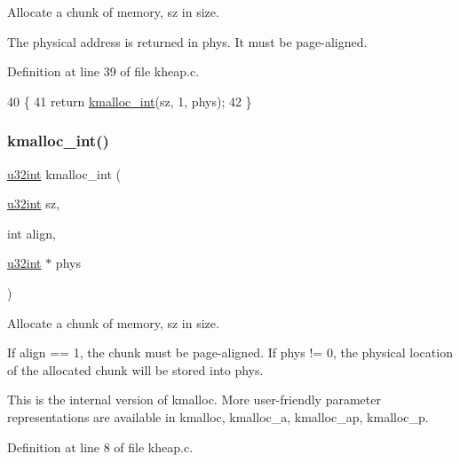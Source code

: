 Allocate a chunk of memory, sz in size. 

The physical address is returned in phys. It must be page-\/aligned. 

Definition at line 39 of file kheap.\+c.


\begin{DoxyCode}
40 \{
41     \textcolor{keywordflow}{return} \hyperlink{a00062_a8b976e8a7e805ef85fcfa68b9b9bbd63_a8b976e8a7e805ef85fcfa68b9b9bbd63}{kmalloc\_int}(sz, 1, phys);
42 \}
\end{DoxyCode}
\mbox{\label{a00065_a8b976e8a7e805ef85fcfa68b9b9bbd63_a8b976e8a7e805ef85fcfa68b9b9bbd63}} 
\subsubsection{\texorpdfstring{kmalloc\+\_\+int()}{kmalloc\_int()}}
{\footnotesize\ttfamily \hyperlink{a00116_a7ae3a26c17ddfe117c6291739780801d_a7ae3a26c17ddfe117c6291739780801d}{u32int} kmalloc\+\_\+int (\begin{DoxyParamCaption}\item[{\hyperlink{a00116_a7ae3a26c17ddfe117c6291739780801d_a7ae3a26c17ddfe117c6291739780801d}{u32int}}]{sz,  }\item[{int}]{align,  }\item[{\hyperlink{a00116_a7ae3a26c17ddfe117c6291739780801d_a7ae3a26c17ddfe117c6291739780801d}{u32int} $\ast$}]{phys }\end{DoxyParamCaption})}



Allocate a chunk of memory, sz in size. 

If align == 1, the chunk must be page-\/aligned. If phys != 0, the physical location of the allocated chunk will be stored into phys.

This is the internal version of kmalloc. More user-\/friendly parameter representations are available in kmalloc, kmalloc\+\_\+a, kmalloc\+\_\+ap, kmalloc\+\_\+p. 

Definition at line 8 of file kheap.\+c.


